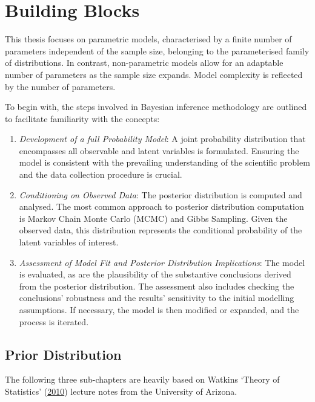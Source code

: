 \documentclass[
  11pt,
]{article}
\begin{document}
\newpage

\section{Building Blocks}

This thesis focuses on parametric models, characterised by a finite
number of parameters independent of the sample size, belonging to the
parameterised family of distributions. In contrast, non-parametric
models allow for an adaptable number of parameters as the sample size
expands. Model complexity is reflected by the number of parameters.

To begin with, the steps involved in Bayesian inference methodology are
outlined to facilitate familiarity with the concepts:

\begin{enumerate}
\def\labelenumi{\arabic{enumi}.}
\item
  \emph{Development of a full Probability Model}: A joint probability
  distribution that encompasses all observable and latent variables is
  formulated. Ensuring the model is consistent with the prevailing
  understanding of the scientific problem and the data collection
  procedure is crucial.
\item
  \emph{Conditioning on Observed Data}: The posterior distribution is
  computed and analysed. The most common approach to posterior
  distribution computation is Markov Chain Monte Carlo (MCMC) and Gibbs
  Sampling. Given the observed data, this distribution represents the
  conditional probability of the latent variables of interest.
\item
  \emph{Assessment of Model Fit and Posterior Distribution
  Implications}: The model is evaluated, as are the plausibility of the
  substantive conclusions derived from the posterior distribution. The
  assessment also includes checking the conclusions' robustness and the
  results' sensitivity to the initial modelling assumptions. If
  necessary, the model is then modified or expanded, and the process is
  iterated.
\end{enumerate}

\subsection{Prior Distribution}

The following three sub-chapters are heavily based on Watkins `Theory of
Statistics' (\protect\hyperlink{ref-Watkins2010}{2010}) lecture notes
from the University of Arizona.
\end{document}
